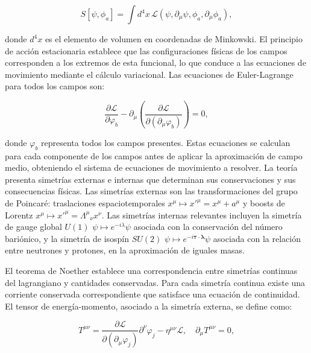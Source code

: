 \begin{equation}
	S[\psi, \phi_a] = \int d^4x \, \mathcal{L}(\psi, \partial_\mu \psi, \phi_a, \partial_\mu \phi_a),
	\label{eq:accion}
\end{equation}

donde $d^4x$ es el elemento de volumen en coordenadas de Minkowski. El principio de acción estacionaria establece que las configuraciones físicas de los campos corresponden a los extremos de esta funcional, lo que conduce a las ecuaciones de movimiento mediante el cálculo variacional. Las ecuaciones de Euler-Lagrange para todos los campos son:

\begin{equation}
	\frac{\partial \mathcal{L}}{\partial \varphi_b} - \partial_\mu \left( \frac{\partial \mathcal{L}}{\partial (\partial_\mu \varphi_b)} \right) = 0,
	\label{eq:euler_lagrange}
\end{equation}

donde $\varphi_b$ representa todos los campos presentes. Estas ecuaciones se calculan para cada componente de los campos antes de aplicar la aproximación de campo medio, obteniendo el sistema de ecuaciones de movimiento a resolver. La teoría presenta simetrías externas e internas que determinan sus conservaciones y sus consecuencias físicas. Las simetrías externas son las transformaciones del grupo de Poincaré: traslaciones espaciotemporales $x^\mu \mapsto x'^\mu = x^\mu + a^\mu$ y boosts de Lorentz $x^\mu \mapsto x'^\mu = \Lambda^\mu{}_\nu x^\nu$. Las simetrías internas relevantes incluyen la simetría de gauge global $U(1)$ $\psi \mapsto e^{-i\lambda}\psi$ asociada con la conservación del número bariónico, y la simetría de isospín $SU(2)$ $\psi \mapsto e^{-i\boldsymbol{\tau}\cdot\boldsymbol{\lambda}}\psi$ asociada con la relación entre neutrones y protones, en la aproximación de iguales masas.

El teorema de Noether establece una correspondencia entre simetrías continuas del lagrangiano y cantidades conservadas. Para cada simetría continua existe una corriente conservada correspondiente que satisface una ecuación de continuidad. El tensor de energía-momento, asociado a la simetría externa, se define como:

\begin{equation}
	T^{\mu\nu} = \frac{\partial \mathcal{L}}{\partial (\partial_\mu \varphi_j)} \partial^\nu \varphi_j - \eta^{\mu\nu} \mathcal{L}, \quad \partial_\mu T^{\mu\nu} = 0,
	\label{eq:tensor_energia_momento}
\end{equation}

